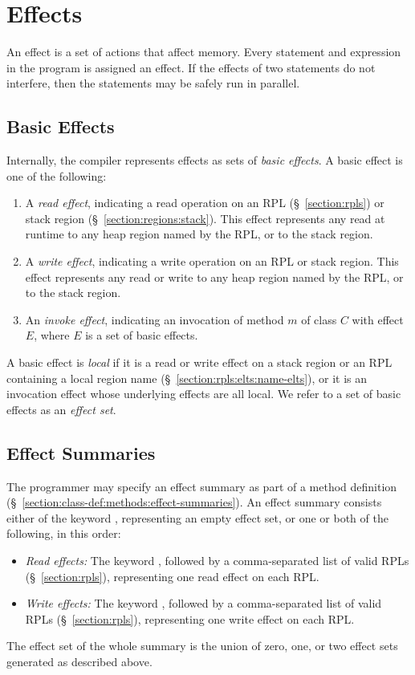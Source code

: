 \section{Effects}
\label{section:effects}

An effect is a set of actions that affect memory.  Every statement and
expression in the program is assigned an effect.  If the effects of
two statements do not interfere, then the statements may be safely run
in parallel.

\subsection{Basic Effects}
\label{section:effects:basic}

Internally, the compiler represents effects as sets of \emph{basic
  effects}.  A basic effect is one of the following:
%
\begin{enumerate}
%
\item A \emph{read effect}, indicating a read operation on an RPL
  (\S~\ref{section:rpls}) or stack region
  (\S~\ref{section:regions:stack}).  This effect represents any read at
  runtime to any heap region named by the RPL, or to the stack region.
%
\item A \emph{write effect}, indicating a write operation on an RPL or
  stack region.  This effect represents any read or write to any heap
  region named by the RPL, or to the stack region.
%
\item An \emph{invoke effect}, indicating an invocation of method $m$
  of class $C$ with effect $E$, where $E$ is a set of basic effects.
%
\end{enumerate}
%
A basic effect is \emph{local} if it is a read or write effect on a
stack region or an RPL containing a local region name
(\S~\ref{section:rpls:elts:name-elts}), or it is an invocation effect
whose underlying effects are all local.  We refer to a set of basic
effects as an \emph{effect set}.


\subsection{Effect Summaries}
\label{section:effects:summaries}

The programmer may specify an effect summary as part of a method
definition (\S~\ref{section:class-def:methods:effect-summaries}).  An
effect summary consists either of the keyword , representing
an empty effect set, or one or both of the following, in this order:
%
\begin{itemize}
%
\item \emph{Read effects:} The keyword , followed by a
  comma-separated list of valid RPLs (\S~\ref{section:rpls}),
  representing one read effect on each RPL.
%
\item \emph{Write effects:} The keyword , followed by a
  comma-separated list of valid RPLs (\S~\ref{section:rpls}),
  representing one write effect on each RPL.
%
\end{itemize}
%
The effect set of the whole summary is the union of zero, one, or two
effect sets generated as described above.


